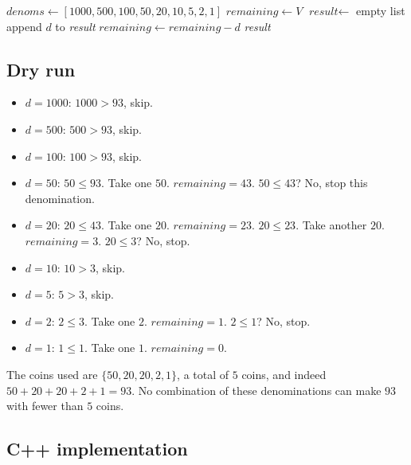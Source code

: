 \begin{algorithm}[H]
\caption{Minimum Number of Coins (Canonical System)}
\begin{algorithmic}[1]
  \State $\textit{denoms} \gets [1000, 500, 100, 50, 20, 10, 5, 2, 1]$
  \State $\textit{remaining} \gets V$
  \State $\textit{result} \gets$ empty list
      \State append $d$ to \textit{result}
      \State $\textit{remaining} \gets \textit{remaining} - d$
    \EndWhile
  \EndFor
  \State \Return \textit{result}
\EndProcedure
\end{algorithmic}
\end{algorithm}

\subsection*{Dry run}


\begin{itemize}
  \item $d = 1000$: $1000 > 93$, skip.
  \item $d = 500$: $500 > 93$, skip.
  \item $d = 100$: $100 > 93$, skip.
  \item $d = 50$: $50 \le 93$. Take one $50$. $\textit{remaining} = 43$.
        $50 \le 43$? No, stop this denomination.
  \item $d = 20$: $20 \le 43$. Take one $20$. $\textit{remaining} = 23$.
        $20 \le 23$. Take another $20$. $\textit{remaining} = 3$.
        $20 \le 3$? No, stop.
  \item $d = 10$: $10 > 3$, skip.
  \item $d = 5$: $5 > 3$, skip.
  \item $d = 2$: $2 \le 3$. Take one $2$. $\textit{remaining} = 1$.
        $2 \le 1$? No, stop.
  \item $d = 1$: $1 \le 1$. Take one $1$. $\textit{remaining} = 0$.
\end{itemize}

The coins used are $\{50, 20, 20, 2, 1\}$, a total of $5$ coins, and indeed
$50 + 20 + 20 + 2 + 1 = 93$. No combination of these denominations can make
$93$ with fewer than $5$ coins.

\subsection*{C++ implementation}

